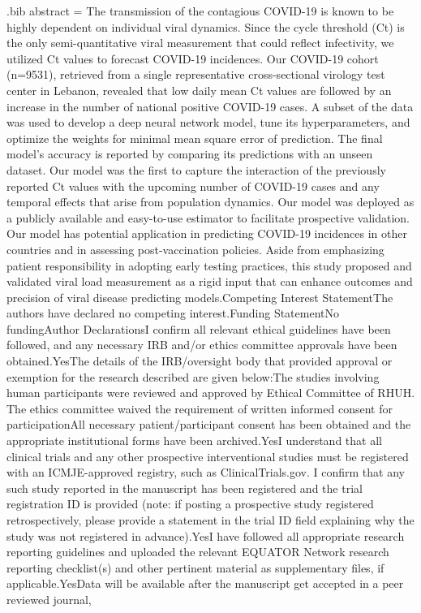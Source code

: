 \begin{filecontents}{\jobname.bib}
abstract = {The transmission of the contagious COVID-19 is known to be highly dependent on individual viral dynamics. Since the cycle threshold (Ct) is the only semi-quantitative viral measurement that could reflect infectivity, we utilized Ct values to forecast COVID-19 incidences. Our COVID-19 cohort (n=9531), retrieved from a single representative cross-sectional virology test center in Lebanon, revealed that low daily mean Ct values are followed by an increase in the number of national positive COVID-19 cases. A subset of the data was used to develop a deep neural network model, tune its hyperparameters, and optimize the weights for minimal mean square error of prediction. The final model{\textquoteright}s accuracy is reported by comparing its predictions with an unseen dataset. Our model was the first to capture the interaction of the previously reported Ct values with the upcoming number of COVID-19 cases and any temporal effects that arise from population dynamics. Our model was deployed as a publicly available and easy-to-use estimator to facilitate prospective validation. Our model has potential application in predicting COVID-19 incidences in other countries and in assessing post-vaccination policies. Aside from emphasizing patient responsibility in adopting early testing practices, this study proposed and validated viral load measurement as a rigid input that can enhance outcomes and precision of viral disease predicting models.Competing Interest StatementThe authors have declared no competing interest.Funding StatementNo fundingAuthor DeclarationsI confirm all relevant ethical guidelines have been followed, and any necessary IRB and/or ethics committee approvals have been obtained.YesThe details of the IRB/oversight body that provided approval or exemption for the research described are given below:The studies involving human participants were reviewed and approved by Ethical Committee of RHUH. The ethics committee waived the requirement of written informed consent for participationAll necessary patient/participant consent has been obtained and the appropriate institutional forms have been archived.YesI understand that all clinical trials and any other prospective interventional studies must be registered with an ICMJE-approved registry, such as ClinicalTrials.gov. I confirm that any such study reported in the manuscript has been registered and the trial registration ID is provided (note: if posting a prospective study registered retrospectively, please provide a statement in the trial ID field explaining why the study was not registered in advance).YesI have followed all appropriate research reporting guidelines and uploaded the relevant EQUATOR Network research reporting checklist(s) and other pertinent material as supplementary files, if applicable.YesData will be available after the manuscript get accepted in a peer reviewed journal},

\end{filecontents}
